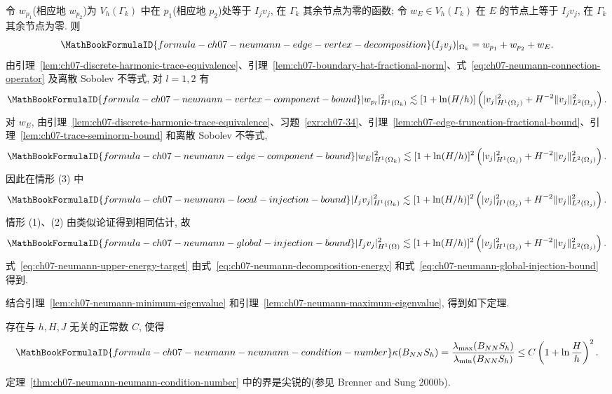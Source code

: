 \begin{Proof}
令 $w_{p_1}$(相应地 $w_{p_2}$)为 $V_h(\Gamma_k)$ 中在 $p_1$(相应地 $p_2$)处等于 $I_jv_j$, 在 $\Gamma_k$ 其余节点为零的函数; 令 $w_E\in V_h(\Gamma_k)$ 在 $E$ 的节点上等于 $I_jv_j$, 在 $\Gamma_k$ 其余节点为零. 则
\[
\MathBookFormulaID{formula-ch07-neumann-edge-vertex-decomposition}
(I_jv_j)|_{\Omega_k}=w_{p_1}+w_{p_2}+w_E.
\]
由引理~\ref{lem:ch07-discrete-harmonic-trace-equivalence}、引理~\ref{lem:ch07-boundary-hat-fractional-norm}、式~\eqref{eq:ch07-neumann-connection-operator} 及离散 Sobolev 不等式, 对 $l=1,2$ 有
\[
\MathBookFormulaID{formula-ch07-neumann-vertex-component-bound}
|w_{p_l}|_{H^1(\Omega_k)}^2
\lesssim[1+\ln(H/h)]
\left(|v_j|_{H^1(\Omega_j)}^2
+H^{-2}\|v_j\|_{L^2(\Omega_j)}^2\right).
\]
对 $w_E$, 由引理~\ref{lem:ch07-discrete-harmonic-trace-equivalence}、习题~\ref{exr:ch07-34}、引理~\ref{lem:ch07-edge-truncation-fractional-bound}、引理~\ref{lem:ch07-trace-seminorm-bound} 和离散 Sobolev 不等式,
\[
\MathBookFormulaID{formula-ch07-neumann-edge-component-bound}
|w_E|_{H^1(\Omega_k)}^2
\lesssim[1+\ln(H/h)]^2
\left(|v_j|_{H^1(\Omega_j)}^2
+H^{-2}\|v_j\|_{L^2(\Omega_j)}^2\right).
\]
因此在情形 (3) 中
\[
\MathBookFormulaID{formula-ch07-neumann-local-injection-bound}
|I_jv_j|_{H^1(\Omega_k)}^2
\lesssim[1+\ln(H/h)]^2
\left(|v_j|_{H^1(\Omega_j)}^2
+H^{-2}\|v_j\|_{L^2(\Omega_j)}^2\right).
\]
情形 (1)、(2) 由类似论证得到相同估计, 故
\begin{equation}
\MathBookFormulaID{formula-ch07-neumann-global-injection-bound}
\label{eq:ch07-neumann-global-injection-bound}
|I_jv_j|_{H^1(\Omega)}^2
\lesssim[1+\ln(H/h)]^2
\left(|v_j|_{H^1(\Omega_j)}^2
+H^{-2}\|v_j\|_{L^2(\Omega_j)}^2\right).
\end{equation}
式~\eqref{eq:ch07-neumann-upper-energy-target} 由式~\eqref{eq:ch07-neumann-decomposition-energy} 和式~\eqref{eq:ch07-neumann-global-injection-bound} 得到.
\end{Proof}

结合引理~\ref{lem:ch07-neumann-minimum-eigenvalue} 和引理~\ref{lem:ch07-neumann-maximum-eigenvalue}, 得到如下定理.

\begin{Theorem}
\label{thm:ch07-neumann-neumann-condition-number}
存在与 $h,H,J$ 无关的正常数 $C$, 使得
\[
\MathBookFormulaID{formula-ch07-neumann-neumann-condition-number}
\kappa(B_{NN}S_h)
=\frac{\lambda_{\max}(B_{NN}S_h)}{\lambda_{\min}(B_{NN}S_h)}
\leq C\left(1+\ln\frac{H}{h}\right)^2.
\]
\end{Theorem}

\begin{Remark}
\label{rem:ch07-neumann-bound-sharpness}
定理~\ref{thm:ch07-neumann-neumann-condition-number} 中的界是尖锐的(参见 Brenner and Sung 2000b).
\end{Remark}

